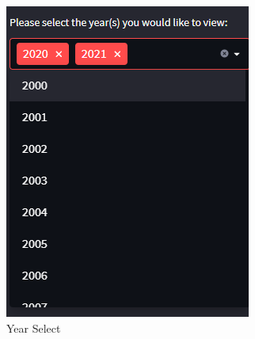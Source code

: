 \begin{figure}[ht]
\begin{minipage}[b]{0.4\textwidth}
        \includegraphics[width=\textwidth]{Images/year.png}
        \caption{Year Select}
        \label{fig:image1}
    \end{minipage}
    

\end{figure}
